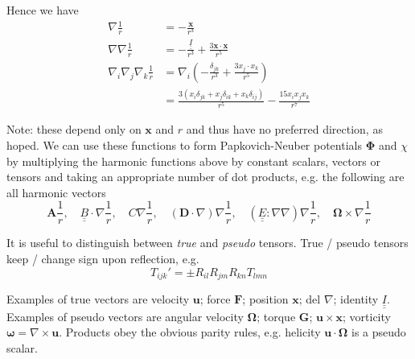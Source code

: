 \documentclass{jknotes}
\newcommand{\dunder}[1]{\underline{\underline{#1}}}
\newcommand{\x}{\bm{x}}
\newcommand{\inv}[1]{\frac{1}{#1}}
\begin{document}
Hence we have
\begin{equation}
	\begin{aligned}
		\nabla \inv{r} &= -\frac{\x}{r^3} \\
		\nabla \nabla \inv{r} &= -\frac{\dunder{I}}{r^3} +
		\frac{3\x\cdot\x}{r^5} \\
		\nabla_i \nabla_j \nabla_k \inv{r} &= \nabla_i \left(
		-\frac{\delta_{jk}}{r^3} + \frac{3x_j\cdot x_k}{r^5}\right)\\
		&= \frac{3(x_i \delta_{jk} + x_j \delta_{ik} + x_k \delta_{ij})}{r^5}
		- \frac{15 x_i x_j x_k}{r^7}
	\end{aligned}
\end{equation}

Note: these depend only on $\x$ and $r$ and thus have no preferred direction,
as hoped. We can use these functions to form Papkovich-Neuber potentials
$\bm{\Phi}$ and $\chi$ by multiplying the harmonic functions above by constant
scalars, vectors or tensors and taking an appropriate number of dot products,
e.g. the following are all harmonic vectors
\begin{equation}
	\bm{A} \inv{r}, \hspace{1em} \dunder{B} \cdot \nabla \inv{r},
	\hspace{1em} C \nabla \inv{r}, \hspace{1em} (\bm{D} \cdot \nabla)\nabla
	\inv{r}, \hspace{1em} (\dunder{E}:\nabla\nabla)\nabla\inv{r}, \hspace{1em}
	\bm{\Omega} \times \nabla \inv{r}
\end{equation}

It is useful to distinguish between \emph{true} and \emph{pseudo} tensors.
True / pseudo tensors keep / change sign upon reflection, e.g.
\begin{equation}
	T_{ijk}' = \pm R_{il} R_{jm} R_{kn} T_{lmn}
\end{equation}

Examples of true vectors are velocity $\bm{u}$; force $\bm{F}$; position $\x$;
 del $\nabla$; identity $\dunder{I}$.
Examples of pseudo vectors are angular velocity $\bm{\Omega}$; torque
$\bm{G}$; $\bm{u} \times \x$; vorticity $\bm{\omega} = \nabla \times \bm{u}$.
Products obey the obvious parity rules, e.g. helicity $\bm{u} \cdot
\bm{\Omega}$ is a pseudo scalar.
\end{document}
